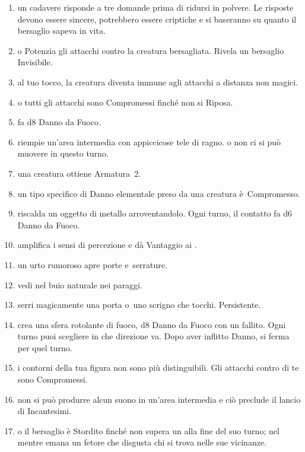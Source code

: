 \documentclass[itdr]{subfiles}
\begin{document}
\begin{enumerate}
	\item {} un cadavere risponde a tre domande prima di ridursi in polvere. Le risposte devono essere sincere, potrebbero essere criptiche e si baseranno su quanto il bersaglio sapeva in vita.
	\item {}  o Potenzia gli attacchi contro la creatura bersagliata. Rivela un bersaglio Invisibile.
	\item {} al tuo tocco, la creatura diventa immune agli attacchi a distanza non magici.
	\item {}  o tutti gli attacchi sono Compromessi finché non si Riposa.
	\item {} fa d8 Danno da Fuoco.
	\item {} riempie un'area intermedia con appiccicose tele di ragno.  o non ci si può muovere in questo turno.
	\item {} una creatura ottiene Armatura~2.
	\item {} un tipo \mbox{specifico} di Danno elementale preso da una creatura è~Compromesso.
	\item {} riscalda un oggetto di metallo arroventandolo. Ogni turno, il contatto fa d6 Danno da Fuoco.
	\item {} amplifica i sensi di percezione e dà Vantaggio ai .
	\item {} un urto rumoroso apre porte \mbox{e serrature.}
	\item {} vedi nel buio naturale nei paraggi.
	\item {} serri magicamente una porta o~uno scrigno che tocchi. Persistente.
	\item {} crea una sfera rotolante di fuoco, d8 Danno da Fuoco con un  fallito. Ogni turno puoi scegliere in che direzione va. Dopo aver inflitto Danno, si ferma per quel turno.
	\item {} i contorni della tua figura non sono più distinguibili. Gli attacchi contro di te sono Compromessi.
	\item {} non si può produrre alcun suono in un'area intermedia e ciò preclude il lancio di Incantesimi.
	\item {}  o il bersaglio è Stordito finché non supera un  alla fine del suo turno; nel mentre emana un fetore che disgusta chi si trova nelle sue vicinanze.

\end{enumerate}
\end{document}
